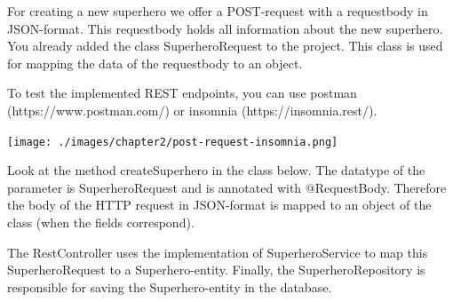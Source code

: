 \documentclass[a4paper, 12pt]{report}
\begin{document}
For creating a new superhero we offer a POST-request with a requestbody in JSON-format. This requestbody holds all information about the new superhero.  You already added the class SuperheroRequest to the project. This class is used for mapping the data of the requestbody to an object.

To test the implemented REST endpoints,  you can use postman (https://www.postman.com/) or insomnia (https://insomnia.rest/). 

\texttt{[image: ./images/chapter2/post-request-insomnia.png]} 

Look at the method createSuperhero in the class below. The datatype of the parameter is SuperheroRequest and is annotated with @RequestBody.  Therefore the body of the HTTP request in JSON-format is mapped to an object of the class (when the fields correspond). 

The RestController uses the implementation of SuperheroService to map this SuperheroRequest to a Superhero-entity. Finally, the SuperheroRepository is responsible for saving the Superhero-entity in the database. 
\end{document}

